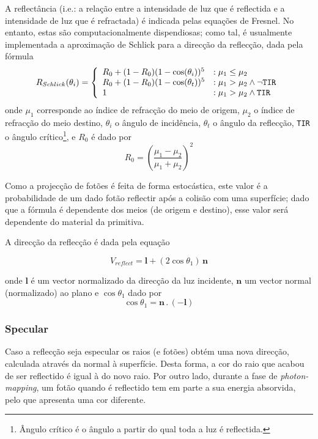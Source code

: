 \documentclass[a4paper]{article}
\begin{document}
\indent A reflectância (i.e.: a relação entre a intensidade de luz que é reflectida e a intensidade de luz que é refractada) é indicada pelas equações de Fresnel.
No entanto, estas são computacionalmente dispendiosas; como tal, é usualmente implementada a aproximação de Schlick para a direcção da reflecção,
dada pela fórmula
\begin{displaymath}
	R_{Schlick}(\theta_{i}) = \left\{
		\begin{array}{ll}
			R_{0} + (1 - R_{0}) (1 - \cos(\theta_{i}))^{5} & : \mu_{1} \leq \mu_{2} \\
			R_{0} + (1 - R_{0}) (1 - \cos(\theta_{t}))^{5} & : \mu_{1} > \mu_{2} \wedge \neg \text{\texttt{TIR}} \\
			1 & : \mu_{1} > \mu_{2} \wedge \text{\texttt{TIR}}
		\end{array}
	\right.
\end{displaymath}
onde $\mu_{1}$ corresponde ao índice de refracção do meio de origem, $\mu_{2}$ o índice de refracção do meio destino, $\theta_{i}$ o ângulo de incidência,
$\theta_{t}$ o ângulo da reflecção, \texttt{TIR} o ângulo crítico\footnote{Ângulo crítico é o ângulo a partir do qual toda a luz é reflectida.}, e $R_{0}$ é dado por
\begin{displaymath}
	R_{0} = \left(\frac{\mu_{1} - \mu_{2}}{\mu_{1} + \mu_{2}}\right)^2
\end{displaymath}

Como a projecção de fotões é feita de forma estocástica, este valor é a probabilidade de um dado fotão reflectir após a colisão com uma superfície;
dado que a fórmula é dependente dos meios (de origem e destino), esse valor será dependente do material da primitiva.

A direcção da reflecção é dada pela equação

\begin{displaymath}
	V_{reflect} = \mathbf{l} + (2 \cos{\theta_{1}}) \, \mathbf{n}
\end{displaymath}

onde $\mathbf{l}$ é um vector normalizado da direcção da luz incidente, $\mathbf{n}$ um vector normal (normalizado) ao plano e $\cos{\theta_{1}}$ dado por
\begin{displaymath}
	\cos{\theta_{1}} = \mathbf{n} \, . \, (\mathbf{-l})
\end{displaymath}

\subsubsection{Specular}
\indent \indent Caso a reflecção seja especular os raios (e fotões) obtém uma nova direcção,
calculada através da normal à superfície. Desta forma, a cor do raio que acabou de ser reflectido é igual à do novo raio.
Por outro lado, durante a fase de \emph{photon-mapping}, um fotão quando é reflectido tem em parte a sua energia absorvida, pelo que apresenta uma cor diferente.
\end{document}
